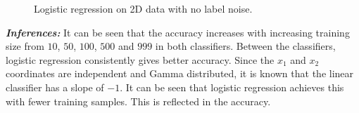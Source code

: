 \documentclass[12pt, a4 paper]{article}
\begin{document}
\begin{figure}

\caption{Logistic regression on 2D data with no label noise.}
\label{fig:LOG_ex1_noise0}
\end{figure}

{\it \bfseries Inferences:} It can be seen that the accuracy increases with increasing training size from $10$, $50$, $100$, $500$ and $999$ in both classifiers. Between the classifiers, logistic regression consistently gives better accuracy. Since the $x_{1}$ and $x_{2}$ coordinates are independent and Gamma distributed, it is known that the linear classifier has a slope of $-1$. It can be seen that logistic regression achieves this with fewer training samples. This is reflected in the accuracy. \\
\end{document}
